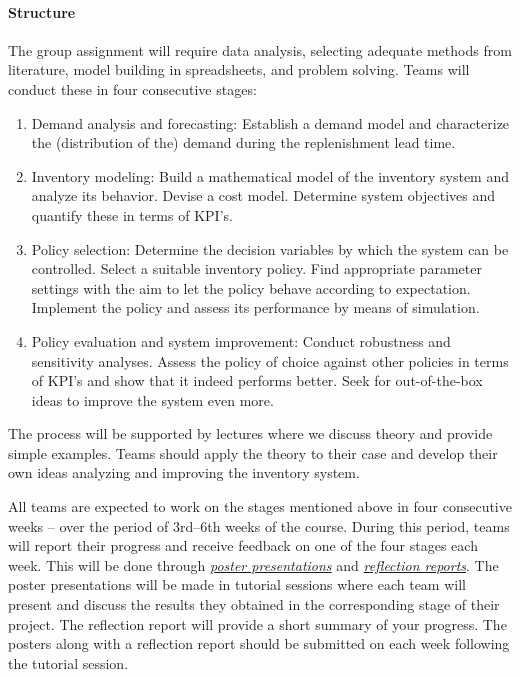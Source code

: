 \documentclass{article}
\begin{document}
\paragraph{Structure} The group assignment will require data analysis, selecting adequate methods from literature, model building in spreadsheets, and problem solving. Teams will conduct these in four consecutive stages: 
\begin{enumerate}[leftmargin=*,label=Stage \arabic*:]
\item Demand analysis and forecasting: Establish a demand model and characterize the (distribution of the) demand during the replenishment lead time.
\item Inventory modeling: Build a mathematical model of the inventory system and analyze its behavior. Devise a cost model. Determine system objectives and quantify these in terms of KPI's.
\item Policy selection: Determine the decision variables by which the system can be controlled. Select a suitable inventory policy. Find appropriate parameter settings with the aim  to let the policy behave according to expectation. Implement the policy and assess its performance by means of simulation.
\item Policy evaluation and system improvement: Conduct robustness and sensitivity analyses. Assess the policy of choice against other policies in terms of KPI's and show that it indeed performs better. Seek for out-of-the-box ideas to improve the system even more.
\end{enumerate}

The process will be supported by lectures where we discuss theory and provide simple examples. Teams should apply the theory to their case and develop their own ideas analyzing and improving the inventory system.

All teams are expected to work on the stages mentioned above in four consecutive weeks -- over the period of 3rd--6th weeks of the course. During this period, teams will report their progress and receive feedback on one of the four stages each week. This will be done through \hyperref[par:presentation]{\textit{poster presentations}} and \hyperref[par:reflection]{\textit{reflection reports}}. The poster presentations will be made in tutorial sessions where each team will present and discuss the results they obtained in the corresponding stage of their project. The reflection report will provide a short summary of your progress. The posters along with a reflection report should be submitted on \nestor each week following the tutorial session. 
\end{document}
